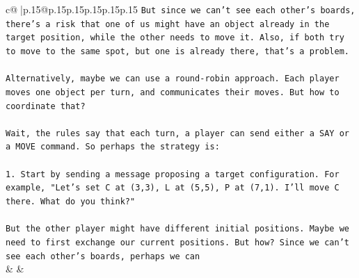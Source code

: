 \documentclass{article}
\begin{document}
{\begin{supertabular}{c@{$\;$}|p{.15\linewidth}@{}p{.15\linewidth}p{.15\linewidth}p{.15\linewidth}p{.15\linewidth}p{.15\linewidth}}
{{{\texttt{But since we can't see each other's boards, there's a risk that one of us might have an object already in the target position, while the other needs to move it. Also, if both try to move to the same spot, but one is already there, that's a problem.} \\
\\ 
\texttt{Alternatively, maybe we can use a round{-}robin approach. Each player moves one object per turn, and communicates their moves. But how to coordinate that?} \\
\\ 
\texttt{Wait, the rules say that each turn, a player can send either a SAY or a MOVE command. So perhaps the strategy is:} \\
\\ 
\texttt{1. Start by sending a message proposing a target configuration. For example, "Let's set C at (3,3), L at (5,5), P at (7,1). I'll move C there. What do you think?"} \\
\\ 
\texttt{But the other player might have different initial positions. Maybe we need to first exchange our current positions. But how? Since we can't see each other's boards, perhaps we can} \\
            }
        }
    }
    & & \\ \\


\end{supertabular}}
\end{document}

